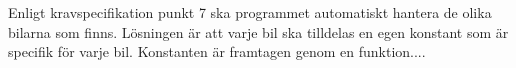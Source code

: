 Enligt kravspecifikation punkt 7 ska programmet automatiskt hantera de olika bilarna som finns. Lösningen är att varje bil ska tilldelas en egen konstant som är specifik för varje bil. Konstanten är framtagen genom en funktion....
